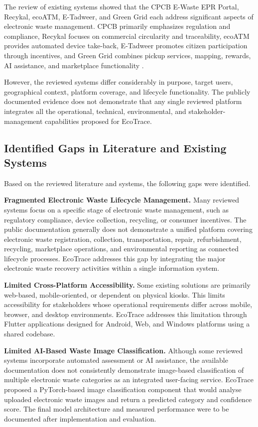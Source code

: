 The review of existing systems showed that the CPCB E-Waste EPR Portal,
Recykal, ecoATM, E-Tadweer, and Green Grid each address significant aspects of
electronic waste management. CPCB primarily emphasizes regulation and
compliance, Recykal focuses on commercial circularity and traceability, ecoATM
provides automated device take-back, E-Tadweer promotes citizen participation
through incentives, and Green Grid combines pickup services, mapping, rewards,
AI assistance, and marketplace functionality
\citep{cpcb2026,ecoatm2026a,etadweer2026,jagtap2026,recykal2026b}.

However, the reviewed systems differ considerably in purpose, target users,
geographical context, platform coverage, and lifecycle functionality. The publicly
documented evidence does not demonstrate that any single reviewed platform
integrates all the operational, technical, environmental, and stakeholder-management
capabilities proposed for EcoTrace.

\subsection{Identified Gaps in Literature and Existing Systems}

Based on the reviewed literature and systems, the following gaps were identified.

\textbf{Fragmented Electronic Waste Lifecycle Management.} Many reviewed
systems focus on a specific stage of electronic waste management, such as
regulatory compliance, device collection, recycling, or consumer incentives. The
public documentation generally does not demonstrate a unified platform covering
electronic waste registration, collection, transportation, repair, refurbishment,
recycling, marketplace operations, and environmental reporting as connected
lifecycle processes. EcoTrace addresses this gap by integrating the major
electronic waste recovery activities within a single information system.

\textbf{Limited Cross-Platform Accessibility.} Some existing solutions are
primarily web-based, mobile-oriented, or dependent on physical kiosks. This limits
accessibility for stakeholders whose operational requirements differ across
mobile, browser, and desktop environments. EcoTrace addresses this limitation
through Flutter applications designed for Android, Web, and Windows platforms
using a shared codebase.

\textbf{Limited AI-Based Waste Image Classification.} Although some
reviewed systems incorporate automated assessment or AI assistance, the
available documentation does not consistently demonstrate image-based
classification of multiple electronic waste categories as an integrated user-facing
service. EcoTrace proposed a PyTorch-based image classification component that
would analyse uploaded electronic waste images and return a predicted category
and confidence score. The final model architecture and measured performance
were to be documented after implementation and evaluation.

